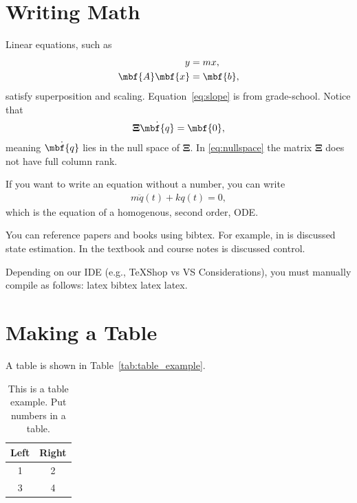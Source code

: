 \documentclass[11pt]{article}
\newcommand{\mbs}[1]{{\boldsymbol{#1}}}
\newcommand{\mbfdot}[1]{{\dot{\mbf{#1}}}}
\begin{document}
\section{Writing Math}

Linear equations, such as
\begin{align}
	y & = m x , \label{eq:slope} \\
	\mbf{A} \mbf{x} & = \mbf{b} , \nonumber
\end{align}
satisfy superposition and scaling. Equation~\eqref{eq:slope} is from grade-school. Notice that
\begin{align}
	\mbs{\Xi} \mbfdot{q} = \mbf{0} , 
	\label{eq:nullspace}
\end{align}
meaning $\mbfdot{q}$ lies in the null space of $\mbs{\Xi}$. In \eqref{eq:nullspace} the matrix $\mbs{\Xi}$ does not have full column rank. 

If you want to write an equation without a number, you can write
\begin{align*}
	m \ddot{q}(t) + k q(t) = 0 ,
\end{align*}
which is the equation of a homogenous, second order, ODE. 

You can reference papers and books using bibtex. For example, in \cite{paper_Zanetti_Majji_Bishop_Morari_2009} is discussed state estimation. In the textbook \cite{book_guzzella} and course notes \cite{notes_francis_ECE311} is discussed control. 

Depending on our IDE (e.g., TeXShop vs VS Considerations), you must manually compile as follows: latex bibtex latex latex. 


\section{Making a Table}
A table is shown in Table~\ref{tab:table_example}.

\begin{table}[h]
\caption{This is a table example. Put numbers in a table.}
\label{tab:table_example}
\vspace{5pt}  %
\begin{center}
\begin{tabular}{|c|c|}
\hline
Left & Right \\
\hline
1 & 2 \\
3 & 4 \\
\hline
\end{tabular}
\end{center}
\label{default}
\end{table}%
\end{document}
